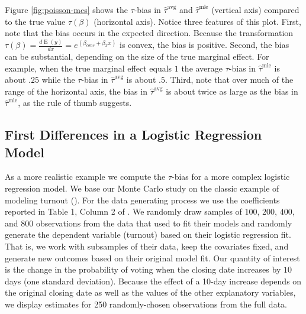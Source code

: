 \documentclass[11pt]{article}
\DeclareMathOperator*{\E}{\text{E}}
\begin{document}
Figure \ref{fig:poisson-mcs} shows the $\tau$-bias in $\hat{\tau}^\text{avg}$ and $\hat{\tau}^\text{mle}$ (vertical axis) compared to the true value $\tau(\beta)$ (horizontal axis).
Notice three features of this plot.
First, note that the bias occurs in the expected direction. Because the transformation $\tau(\beta) = \frac{d \E (y)}{dx} = e^{(\beta_{cons} + \beta_x x)}$ is convex, the bias is positive.
Second, the bias can be substantial, depending on the size of the true marginal effect. For example, when the true marginal effect equals $1$ the average  $\tau$-bias in $\hat{\tau}^\text{mle}$ is about $.25$ while the $\tau$-bias in $\hat{\tau}^\text{avg}$ is about $.5$.
Third, note that over much of the range of the horizontal axis, the bias in $\hat{\tau}^\text{avg}$ is about twice as large as the bias in $\hat{\tau}^\text{mle}$, as the rule of thumb suggests.




\subsection*{First Differences in a Logistic Regression Model}

As a more realistic example we compute the $\tau$-bias for a more complex logistic regression model. We base our Monte Carlo study on the classic example of modeling turnout (\citealt{WolfingerRosenstone1980, Nagler1994, HuangShields2000, BerryDeMerittEsarey2010}). For the data generating process we use the coefficients reported in Table 1, Column 2 of \cite{BerryDeMerittEsarey2010}. We randomly draw samples of $100$, $200$, $400$, and $800$ observations from the data that \cite{BerryDeMerittEsarey2010} used to fit their models and randomly generate the dependent variable (turnout) based on their logistic regression fit. That is, we work with subsamples of their data, keep the covariates fixed, and generate new outcomes based on their original model fit. Our quantity of interest is the change in the probability of voting when the closing date increases by $10$ days (one standard deviation). Because the effect of a 10-day increase depends on the original closing date as well as the values of the other explanatory variables, we display estimates for 250 randomly-chosen observations from the full data.
\end{document}
